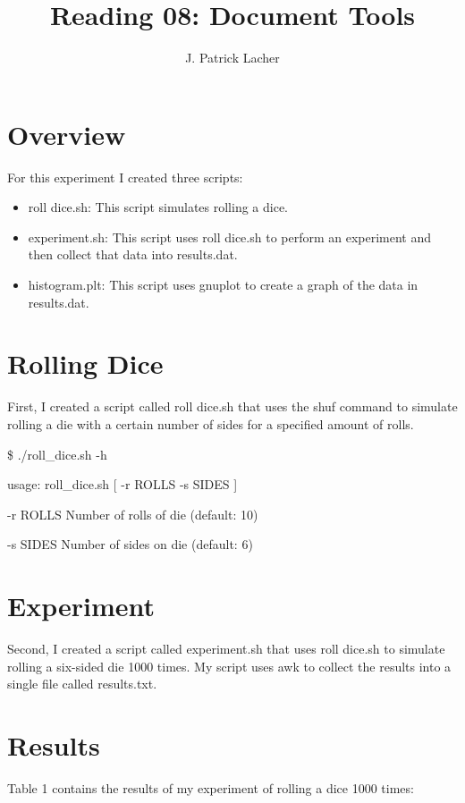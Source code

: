 \documentclass{article}
\title{Reading 08: Document Tools}
\author {J. Patrick Lacher}
\date{}
\begin{document}
	\maketitle
	
	\section{Overview}
	
	For this experiment I created three scripts:
	
	\begin{itemize}
		\item roll dice.sh: This script simulates rolling a dice.
		\item experiment.sh: This script uses roll dice.sh to perform an experiment and then collect that data
into results.dat.
		\item histogram.plt: This script uses gnuplot to create a graph of the data in results.dat.
	\end{itemize}
	
	\section{Rolling Dice}
	
	First, I created a script called roll dice.sh that uses the shuf command to simulate rolling a die with a certain number of sides for a specified amount of rolls.

	\$ ./roll\_dice.sh -h
	
	usage: roll\_dice.sh [ -r ROLLS -s SIDES ]
	
	
	-r ROLLS Number of rolls of die (default: 10)
	
	-s SIDES Number of sides on die (default: 6)

	\section{Experiment}
	
	Second, I created a script called experiment.sh that uses roll dice.sh to simulate rolling a six-sided die 1000 times. My script uses awk to collect the results into a single file called results.txt.
	
	\section{Results}
	
	Table 1 contains the results of my experiment of rolling a dice 1000 times:
	
\end{document}
